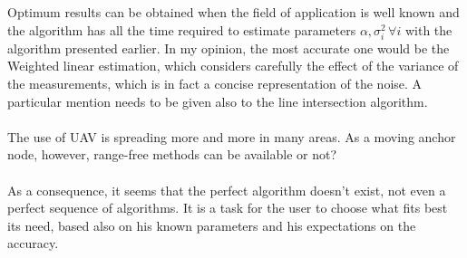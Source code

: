 \documentclass[12pt,twoside]{report}
\begin{document}
Optimum results can be obtained when the field of application is well known and the algorithm has all the time required to estimate parameters $\alpha,\sigma_i^2\,\forall i$ with the algorithm presented earlier. In my opinion, the most accurate one would be the Weighted linear estimation, which considers carefully the effect of the variance of the measurements, which is in fact a concise representation of the noise. A particular mention needs to be given also to the line intersection algorithm.\\\\
The use of UAV is spreading more and more in many areas.
As a moving anchor node, however, range-free methods can be available or not?\\\\
As a consequence, it seems that the perfect algorithm doesn't exist, not even a perfect sequence of algorithms. It is a task for the user to choose what fits best its need, based also on his known parameters and his expectations on the accuracy.\\\\











\clearpage
\printbibliography[
heading=bibintoc,
title={Bibliography}
]


\end{document}
